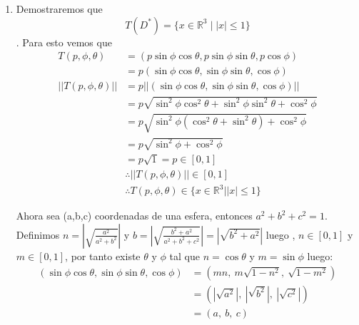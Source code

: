 \documentclass[10pt,letterpaper,fleqn]{article}
\begin{document}
\begin{enumerate}
        \item Demostraremos que $$ T(D^*)=\{ x\in\mathbb{R}^3 \mid |x|\leq 1 \}$$. Para esto vemos que 
        	\begin{equation*}
        	\begin{split}
        		T(p,\phi,\theta) &= (p\sin\phi\cos\theta, p\sin\phi\sin\theta, p\cos\phi) \\
        						 &= p(\sin\phi\cos\theta, \sin\phi\sin\theta, \cos\phi) \\
				||T(p,\phi,\theta)|| &= p ||(\sin\phi\cos\theta, \sin\phi\sin\theta, \cos\phi) || \\
								 &= p\sqrt{\sin^2\phi\cos^2\theta + \sin^2\phi\sin^2\theta + \cos^2\phi} \\ 
								 &= p\sqrt{\sin^2\phi(\cos^2\theta + \sin^2\theta) + \cos^2\phi} \\ 
								 &= p\sqrt{\sin^2\phi + \cos^2\phi} \\
								 &= p\sqrt{1}
								 = p \in \left[0,1\right] \\
								 & \therefore ||T(p,\phi,\theta)|| \in \left[0,1\right] \\
								 & \therefore T(p,\phi,\theta) \in \{ x\in \mathbb{R}^3 | |x| \leq 1 \}
        	\end{split}
        	\end{equation*}

        	Ahora sea (a,b,c) coordenadas de una esfera, entonces $a^2 + b^2 + c^2 = 1$.
        	Definimos $n = \left| \sqrt{\frac{a^2}{a^2 + b^2}}\right| $ y 
        	$b = \left|\sqrt{\frac{b^2 + a^2}{a^2 + b^2 + c^2}}\right| = \left|\sqrt{b^2 + a^2}\right|$
        	luego , $n\in \left[0,1\right]$ y $m\in \left[0,1\right]$, 
        	por tanto existe $\theta$ y $\phi$ tal que $n = \cos\theta$ y $m = \sin\phi$ luego:
        	\begin{equation*}
        	\begin{split}
        		(\sin\phi\cos\theta, \sin\phi\sin\theta, \cos\phi) &= (mn,\ m\sqrt{1-n^2},\ \sqrt{1-m^2}) \\
        														   &= (|\sqrt{a^2}|,\ |\sqrt{b^2}|, \ |\sqrt{c^2}|) \\
        														   &= (a,\ b,\ c)
        	\end{split}
        	\end{equation*} 	


\end{enumerate}
\end{document}
